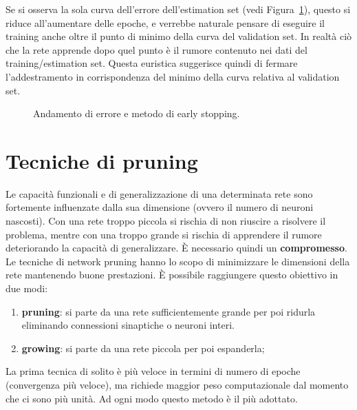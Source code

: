 Se si osserva la sola curva dell'errore dell’estimation set (vedi Figura~\ref{fig:overfit}), questo si riduce all’aumentare delle epoche, e verrebbe naturale pensare di eseguire il training anche oltre il punto di minimo della curva del validation set. In realtà ciò che la rete apprende dopo quel punto è il rumore contenuto nei dati del training/estimation set. Questa euristica suggerisce quindi di fermare l'addestramento in corrispondenza del minimo della curva relativa al validation set.
\begin{figure}[h!]
	\centering
	\caption{Andamento di errore e metodo di early stopping.}\label{fig:overfit}
\end{figure}




\newpage

\section{Tecniche di pruning} %
\label{sec:tecniche_di_pruning}
Le capacità funzionali e di generalizzazione di una determinata rete sono fortemente influenzate dalla sua dimensione (ovvero il numero di neuroni nascosti). Con una rete troppo piccola si rischia di non riuscire a risolvere il problema, mentre con una troppo grande si rischia di apprendere il rumore deteriorando la capacità di generalizzare. È necessario quindi un \textbf{compromesso}.\\

Le tecniche di network pruning hanno lo scopo di minimizzare le dimensioni della rete mantenendo buone prestazioni. È possibile raggiungere questo obiettivo in due modi:
\begin{enumerate}
	\item \textbf{pruning}: si parte da una rete sufficientemente grande per poi ridurla eliminando connessioni sinaptiche o neuroni interi.
	\item \textbf{growing}: si parte da una rete piccola per poi espanderla;
\end{enumerate}
La prima tecnica di solito è più veloce in termini di numero di epoche (convergenza più veloce), ma richiede maggior peso computazionale dal momento che ci sono più unità. Ad ogni modo questo metodo è il più adottato.

